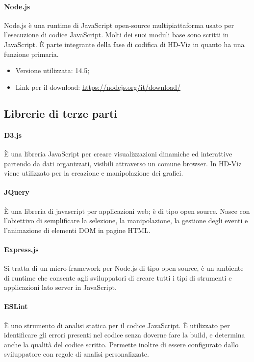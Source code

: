 \documentclass[../manuale_sviluppatore.tex]{subfiles}
\begin{document}
\paragraph{Node.js}
Node.js è una runtime di JavaScript open-source multipiattaforma usato per l’esecuzione di codice JavaScript. Molti dei suoi moduli base sono scritti in JavaScript. 
È parte integrante della fase di codifica di HD-Viz in quanto ha una funzione primaria.\\
\begin{itemize}
    \item Versione utilizzata: 14.5;
    \item Link per il download: \url{https://nodejs.org/it/download/}
\end{itemize}



\subsection{Librerie di terze parti}

\paragraph{D3.js}
È una libreria JavaScript per creare visualizzazioni dinamiche ed interattive partendo da dati organizzati, visibili attraverso un comune browser. 
In HD-Viz viene utilizzato per la creazione e manipolazione dei grafici.

\paragraph{JQuery}
È una libreria di javascript per applicazioni web; è di tipo open source. Nasce con l'obiettivo di semplificare la selezione, la manipolazione, la gestione degli eventi e l'animazione di elementi DOM in pagine HTML.

\paragraph{Express.js}
Si tratta di un micro-framework per Node.js di tipo open source, è un ambiente di runtime che consente agli sviluppatori di creare tutti i tipi di strumenti e applicazioni lato server in JavaScript.

\paragraph{ESLint}
È uno strumento di analisi statica per il codice JavaScript. È utilizzato per identificare gli errori presenti nel codice senza doverne fare la build, e determina anche la qualità del codice scritto. 
Permette inoltre di essere configurato dallo sviluppatore con regole di analisi personalizzate.
\end{document}

